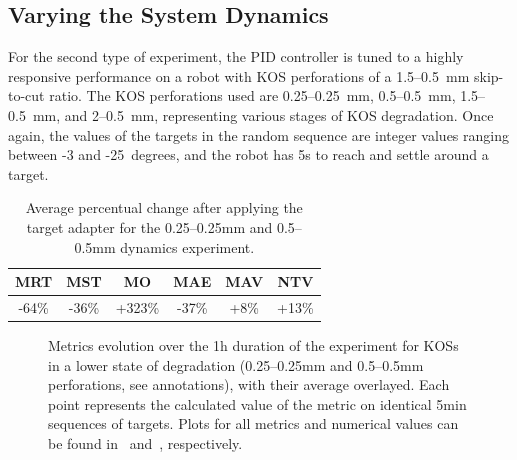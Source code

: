 \subsection{Varying the System Dynamics}\label{subsec:varying-kos}
For the second type of experiment, the PID controller is tuned to a highly responsive performance on a robot with KOS perforations of a 1.5--0.5~\si{\mm} skip-to-cut ratio.
The KOS perforations used are 0.25–0.25~mm, 0.5–0.5~mm, 1.5–0.5~mm, and 2--0.5~mm, representing various stages of KOS degradation.
Once again, the values of the targets in the random sequence are integer values ranging between -3 and -25~degrees, and the robot has 5\si{\second} to reach and settle around a target.

\begin{table}[t]
    \centering
    \caption{Average percentual change after applying the target adapter for the 0.25--0.25\si{\mm} and 0.5--0.5\si{\mm} dynamics experiment.}
    \label{tab:25--25-50--50-percent}
    \begin{tabular}{cccccc}
        \toprule
        MRT              & MST              & MO                & MAE              & MAV             & NTV              \\
        \midrule
        -64\si{\percent} & -36\si{\percent} & +323\si{\percent} & -37\si{\percent} & +8\si{\percent}  & +13\si{\percent}\\
        \bottomrule
    \end{tabular}
\end{table}

\begin{figure}[!t]
    \centering
    
    \vspace*{-2em}
    \caption{Metrics evolution over the 1\si{\hour} duration of the experiment for KOSs in a lower state of degradation (0.25--0.25\si{\mm} and 0.5--0.5\si{\mm} perforations, see annotations), with their average overlayed. Each point represents the calculated value of the metric on identical 5\si{\minute} sequences of targets. Plots for all metrics and numerical values can be found in~ and~, respectively.}
    \label{fig:25--25-50--50-metrics}
\end{figure}

